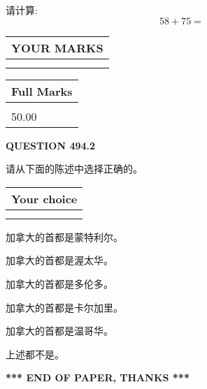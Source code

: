 \documentclass{ctexart}
\begin{document}
  
 
请计算:
\begin{equation}
58 +  %
75 = \nonumber
\end{equation}
 

 

 
  
\vspace{0.2in}
  
\noindent\begin{tabular}{|l|}
\hline
 YOUR MARKS  \\
\hline
 \\ 
 \\ 
\hline
\end{tabular}
\hspace{0.05in} \begin{tabular}{|l|}
\hline
 Full Marks  \\
\hline
 \\ 
50.00 \\
\hline
\end{tabular}
{\textbf{\Large{QUESTION
494.2 
}}}
  
  
请从下面的陈述中选择正确的。
  
  
\noindent\hspace{3.0in} \begin{tabular}{|l|}
\hline
Your choice \\
\hline
 \\ 
 \\ 
\hline
\end{tabular}
  
  
 
 
加拿大的首都是蒙特利尔。
 
 
加拿大的首都是渥太华。
 
 
加拿大的首都是多伦多。
 
 
加拿大的首都是卡尔加里。
 
 
加拿大的首都是温哥华。
 
 
 上述都不是。
 
 
   
   
 \vspace{0.2in}
 
   
   
   
   
\vspace{1.0in} 
{\textbf{\large{ *** END OF PAPER, THANKS *** }}} 
   
\end{document}
